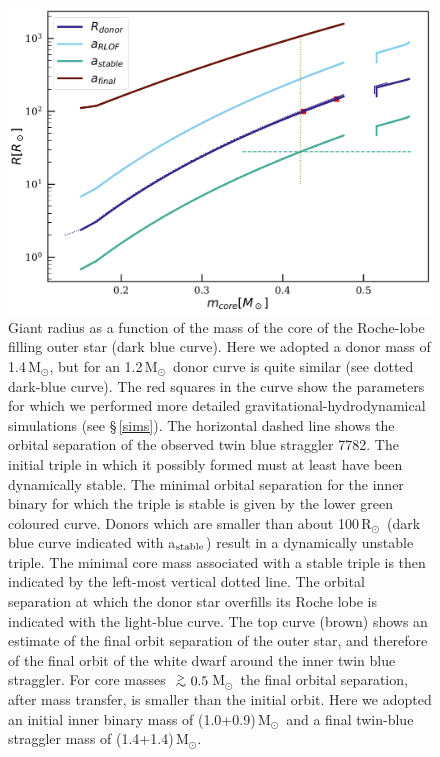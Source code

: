 \documentclass{aastex62}
\newcommand{\MSun}{\mbox{M$_\odot$}}
\newcommand{\RSun}{\mbox{R$_\odot$}}
\def\apgt{\ {\raise-.5ex\hbox{$\buildrel>\over\sim$}}\ }
\begin{document}
\begin{figure}[ht!]
  \includegraphics[width=\columnwidth]{fig_M14MSun_outerorbit.pdf}
  \caption{Giant radius as a function of the mass of the core of the
    Roche-lobe filling outer star (dark blue curve).  Here we adopted
    a donor mass of 1.4\,\MSun, but for an 1.2\,\MSun\, donor curve is
    quite similar (see dotted dark-blue curve).  The red squares in
    the curve show the parameters for which we performed more detailed
    gravitational-hydrodynamical simulations (see \S\,\ref{sims}).
    The horizontal dashed line shows the orbital separation of the
    observed twin blue straggler 7782.  The initial triple in which it
    possibly formed must at least have been dynamically stable. The
    minimal orbital separation for the inner binary for which the
    triple is stable is given by the lower green coloured curve.
    Donors which are smaller than about 100\,\RSun\, (dark blue curve
    indicated with a$_{\rm stable}$) result in a dynamically unstable
    triple. The minimal core mass associated with a stable triple is
    then indicated by the left-most vertical dotted line.  The
    orbital separation at which the donor star overfills its Roche
    lobe is indicated with the light-blue curve. The top curve (brown)
    shows an estimate of the final orbit separation of the outer star,
    and therefore of the final orbit of the white dwarf around the
    inner twin blue straggler.  For core masses $\apgt 0.5$\,\MSun\,
    the final orbital separation, after mass transfer, is smaller
    than the initial orbit.  Here we adopted an initial inner binary
    mass of (1.0+0.9)\,\MSun\, and a final twin-blue straggler mass of
    (1.4+1.4)\,\MSun.
\label{fig:tertiarymass_vs_size}}
\end{figure}
\end{document}
